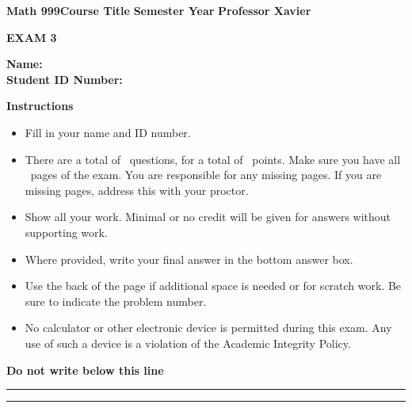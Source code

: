 \documentclass[12pt,letterpaper]{exam}
\newcommand{\course}{Math 999}
\newcommand{\coursetitle}{Course Title}
\newcommand{\examnumber}{3}
\newcommand{\term}{Semester Year}
\newcommand{\instructor}{Professor Xavier}
\newcommand{\scores}{
	\begin{center}
	\addpoints
	\gradetable[h][questions]	%
	\end{center}
}
\newcommand{\bottomline}{\vfill\noindent \rule[2ex]{\textwidth}{2pt}}
\newcommand{\titleinfo}{\textbf{\course}\hfill \textbf{\coursetitle} \hfill \textbf{\term} \hfill \textbf{\instructor} \\ \vspace{-0.5cm}\begin{center} \textbf{EXAM \examnumber} \end{center} \vspace{0.5cm} \textbf{Name:} \underline{\hspace{9cm}} \\[0.5cm] \textbf{Student ID Number:} \underline{\hspace{6.35cm}} \\[0.5cm]}
\newcommand{\noticeline}{\begin{center}{\scriptsize\textbf{Do not write below this line}} \rule{\textwidth}{0.5pt}\end{center}}
\newcommand{\directions}{\begin{center} \textbf{Instructions} \end{center}}
\begin{document}
\titleinfo
\directions
\begin{itemize}
\item Fill in your name and ID number.
\item There are a total of \numquestions\ questions, for a total of \numpoints~points. Make sure you have all \numpages\ pages of the exam. You are responsible for any missing pages. If you are missing pages, address this with your proctor. 
\item Show all your work. Minimal or no credit will be given for answers without supporting work.
\item Where provided, write your final answer in the bottom answer box. 
\item Use the back of the page if additional space is needed or for scratch work. Be sure to indicate the problem number.
\item No calculator or other electronic device is permitted during this exam. Any use of such a device is a violation of the Academic Integrity Policy. 
\end{itemize}

\noticeline
\scores
\bottomline

\newpage
\end{document}
